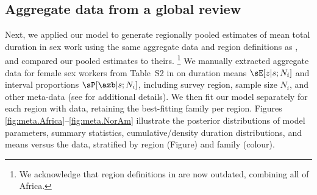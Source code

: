 \subsection{Aggregate data from a global review}
Next, we applied our model to generate
regionally pooled estimates of mean total duration in sex work
using the same aggregate data and region definitions as \citet{Fazito2012},
and compared our pooled estimates to theirs.%
\footnote{We acknowledge that region definitions in \cite{Fazito2012} are now outdated,
  \eg combining all of Africa.}
We manually extracted aggregate data
for female sex workers from Table~S2 in \cite{Fazito2012}
on duration means $\sE[z|s;N_i]$ and interval proportions $\sP[\azb|s;N_i]$,
including survey region, sample size $N_i$, and other meta-data
(see  for additional details).
We then fit our model separately for each region with data,
retaining the best-fitting family per region.
Figures \ref{fig:meta.Africa}--\ref{fig:meta.NorAm} illustrate
the posterior distributions of model parameters, summary statistics,
cumulative/density duration distributions, and means versus the data,
stratified by region (Figure) and family (colour).
